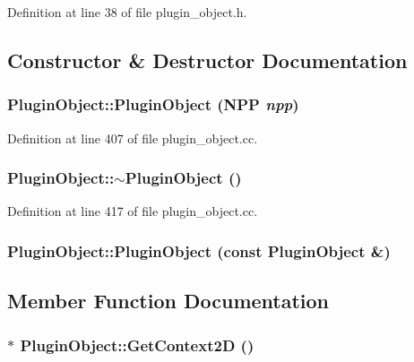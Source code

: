 Definition at line 38 of file plugin\_\-object.h.



\subsection{Constructor \& Destructor Documentation}
\hypertarget{class_plugin_object_ab24118f5b174beacb1b7f652bbbcf78d}{
\subsubsection[{PluginObject}]{\setlength{\rightskip}{0pt plus 5cm}PluginObject::PluginObject ({\bf NPP} {\em npp})}}
\label{class_plugin_object_ab24118f5b174beacb1b7f652bbbcf78d}


Definition at line 407 of file plugin\_\-object.cc.

\hypertarget{class_plugin_object_ab2a72410c84a20133db4dec8ca92b277}{
\subsubsection[{$\sim$PluginObject}]{\setlength{\rightskip}{0pt plus 5cm}PluginObject::$\sim$PluginObject ()}}
\label{class_plugin_object_ab2a72410c84a20133db4dec8ca92b277}


Definition at line 417 of file plugin\_\-object.cc.

\hypertarget{class_plugin_object_ae85850715a04982f81d10136eca3b4f0}{
\subsubsection[{PluginObject}]{\setlength{\rightskip}{0pt plus 5cm}PluginObject::PluginObject (const {\bf PluginObject} \&)}}
\label{class_plugin_object_ae85850715a04982f81d10136eca3b4f0}


\subsection{Member Function Documentation}
\hypertarget{class_plugin_object_ad121e4145b1f1cdcf878208919859e31}{
\subsubsection[{GetContext2D}]{ $\ast$ PluginObject::GetContext2D ()}}
\label{class_plugin_object_ad121e4145b1f1cdcf878208919859e31}


